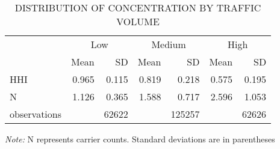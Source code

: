 \begin{table}\centering
	\caption{DISTRIBUTION OF CONCENTRATION BY TRAFFIC VOLUME}\centering
	\begin{threeparttable}
		\begin{tabular}[t]{lrrrrrr}\toprule\multicolumn{1}{c}{ } & \multicolumn{2}{c}{Low} & \multicolumn{2}{c}{Medium} & \multicolumn{2}{c}{High} \\\cmidrule(l{3pt}r{3pt}){2-3} \cmidrule(l{3pt}r{3pt}){4-5} \cmidrule(l{3pt}r{3pt}){6-7}  & Mean & SD & Mean & SD & Mean & SD\\\midrule
			HHI &  {0.965} &  {0.115} &  {0.819} &  {0.218} &  {0.575} &  {0.195}\\
			N &  {1.126} &  {0.365} &  {1.588} &  {0.717} &  {2.596} &  {1.053}\\observations &  &  {62622} &  &  {125257} &  &  {62626}\\\bottomrule
		\end{tabular}
		\begin{tablenotes}
			\item \textit{Note:} N represents carrier counts. Standard deviations are in parentheses
		\end{tablenotes}
	\end{threeparttable}
\end{table}